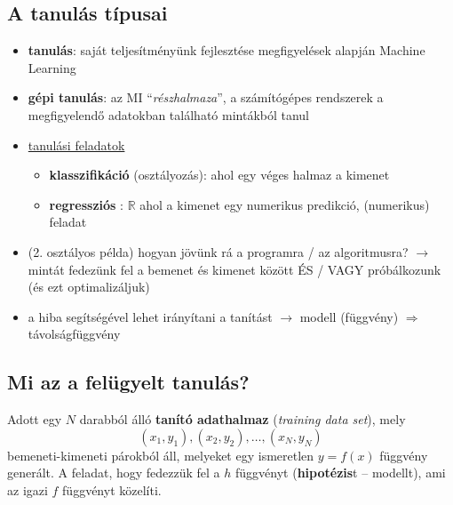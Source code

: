 \documentclass[a4paper, 11pt]{article}
\begin{document}
\subsection{A tanulás típusai}

\begin{itemize}
	\item \textbf{tanulás}: saját teljesítményünk fejlesztése megfigyelések alapján
	Machine Learning
	\item \textbf{gépi tanulás}: az MI ``\textit{részhalmaza}'', a számítógépes rendszerek a megfigyelendő adatokban található mintákból tanul
	\item  \underline{tanulási feladatok}
	\begin{itemize}
		\item \textbf{klasszifikáció} (osztályozás): ahol egy véges halmaz a kimenet
		\item \textbf{regressziós} : $\mathbb{R}$ ahol a kimenet egy numerikus predikció, (numerikus) feladat
	\end{itemize}
	\item (2. osztályos példa) hogyan jövünk rá a programra / az algoritmusra? $\to$ mintát fedezünk fel a bemenet és kimenet között ÉS / VAGY próbálkozunk (és ezt optimalizáljuk)
	\item a hiba segítségével lehet irányítani a tanítást $\to$ modell (függvény) $\Longrightarrow$ távolságfüggvény
\end{itemize}

\subsection{Mi az a felügyelt tanulás?}


\begin{tcolorbox}
	Adott egy $N$ darabból álló \textbf{tanító adathalmaz} (\textit{training data set}), mely \[ (x_1,y_1), (x_2,y_2), \dots, (x_N, y_N) \] bemeneti-kimeneti párokból áll, melyeket egy ismeretlen $y = f(x)$ függvény generált. A feladat, hogy fedezzük fel a $h$ függvényt (\textbf{hipotézis}t -- modellt), ami az igazi $f$ függvényt közelíti.
\end{tcolorbox}
\end{document}
